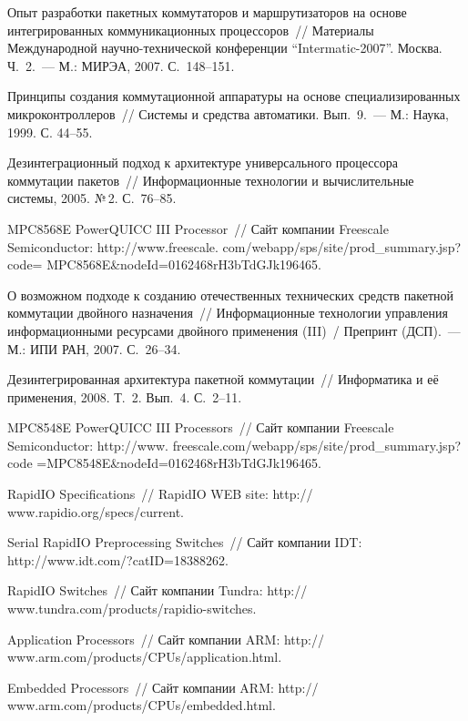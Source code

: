 \begin{multicols}{2}
{{\begin{thebibliography}{99}
Опыт разработки пакетных коммутаторов и маршрутизаторов на основе интегрированных 
коммуникационных процессоров~// Материалы Международной научно-технической 
конференции ``Intermatic-2007''. Москва. Ч.~2.~--- М.: МИРЭА, 2007. С.~148--151.

Принципы создания коммутационной аппаратуры на основе специализированных 
микроконтроллеров~// Системы и средства автоматики. Вып.~9.~--- М.: Наука, 1999. С. 44--55.

Дезинтеграционный подход к архитектуре универсального 
процессора коммутации пакетов~// 
Информационные технологии и вычислительные системы, 
2005. №\,2. С.~76--85.

MPC8568E PowerQUICC III Processor~// Сайт компании Freescale Semiconductor: 
{\sf 
http://www.freescale. com/webapp/sps/site/prod\_summary.jsp?code= MPC8568E\&nodeId=0162468rH3bTdGJk196465}.


О возможном подходе к созданию отечественных технических средств пакетной 
коммутации двойного назначения~// Информационные технологии управления информационными 
ресурсами двойного применения (III)~/ Препринт (ДСП).~--- М.: ИПИ РАН, 2007. 
С.~26--34.


Дезинтегрированная архитектура пакетной коммутации~// 
Информатика и её применения, 2008. Т.~2. Вып.~4. С.~2--11.


MPC8548E PowerQUICC III Processors~// Сайт компании Freescale Semiconductor: 
{\sf http://www. freescale.com/webapp/sps/site/prod\_summary.jsp?code =MPC8548E\&nodeId=0162468rH3bTdGJk196465}.

RapidIO Specifications~// RapidIO WEB site: {\sf http:// www.rapidio.org/specs/current}.

Serial RapidIO Preprocessing Switches~// Сайт компании IDT: {\sf http://www.idt.com/?catID=18388262}.

RapidIO Switches~// Сайт компании Tundra: {\sf http:// www.tundra.com/products/rapidio-switches}.

Application Processors~// Сайт компании ARM: {\sf http:// www.arm.com/products/CPUs/application.html}.

  \label{end\stat}
  
Embedded Processors~// Сайт компании ARM: {\sf http:// www.arm.com/products/CPUs/embedded.html}.
\end{thebibliography}
}
}
\end{multicols}  
 
 
 
 
 